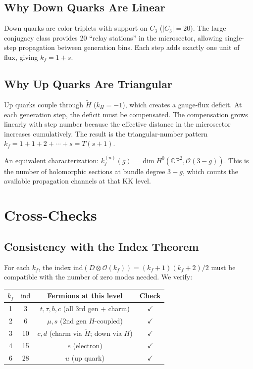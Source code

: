 \documentclass[11pt,a4paper]{article}
\newcommand{\CP}{\mathbb{CP}}
\newcommand{\ind}{\mathrm{ind}}
\theoremstyle{definition}
\theoremstyle{remark}
\begin{document}
\subsection{Why Down Quarks Are Linear}

Down quarks are color triplets with support on $C_3$ ($|C_3| = 20$).
The large conjugacy class provides 20 ``relay stations'' in the
microsector, allowing single-step propagation between generation bins.
Each step adds exactly one unit of flux, giving $k_f = 1 + s$.

\subsection{Why Up Quarks Are Triangular}

Up quarks couple through $\tilde{H}$ ($k_H = -1$), which creates a
gauge-flux deficit.  At each generation step, the deficit must be
compensated.  The compensation grows linearly with step number because
the effective distance in the microsector increases cumulatively.
The result is the triangular-number pattern $k_f = 1 + 1 + 2 + \cdots + s = T(s+1)$.

An equivalent characterization: $k_f^{(u)}(g) = \dim H^0(\CP^2, \mathcal{O}(3-g))$.
This is the number of holomorphic sections at bundle degree $3-g$,
which counts the available propagation channels at that KK level.

\section{Cross-Checks}
\label{sec:checks}

\subsection{Consistency with the Index Theorem}

For each $k_f$, the index $\ind(D \otimes \mathcal{O}(k_f)) = (k_f+1)(k_f+2)/2$
must be compatible with the number of zero modes needed.  We verify:

\begin{center}
\begin{tabular}{cccc}
\toprule
$k_f$ & $\ind$ & Fermions at this level & Check \\
\midrule
1 & 3 & $t, \tau, b, c$ (all 3rd gen + charm) & $\checkmark$ \\
2 & 6 & $\mu, s$ (2nd gen $H$-coupled) & $\checkmark$ \\
3 & 10 & $c, d$ (charm via $\tilde{H}$; down via $H$) & $\checkmark$ \\
4 & 15 & $e$ (electron) & $\checkmark$ \\
6 & 28 & $u$ (up quark) & $\checkmark$ \\
\bottomrule
\end{tabular}
\end{center}
\end{document}
